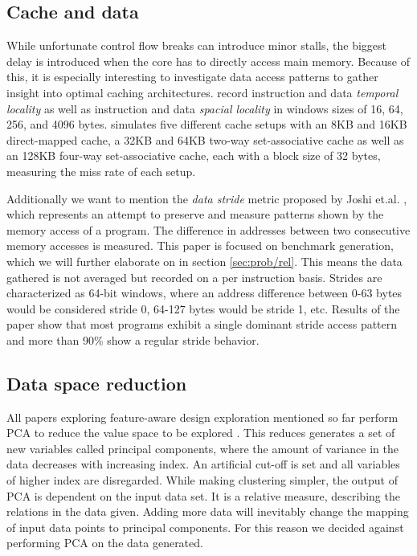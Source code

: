 \documentclass[../bachelor_paper.tex]{subfiles}
\begin{document}
\subsection{Cache and data}
While unfortunate control flow breaks can introduce minor stalls, the biggest delay is introduced when the core has to directly access main memory. Because of this, it is especially interesting to investigate data access patterns to gather insight into optimal caching architectures. \cite{phansalkarMeasuringProgramSimilarity2005,joshiMeasuringBenchmarkSimilarity2006} record instruction and data \emph{temporal locality} as well as instruction and data \emph{spacial locality} in windows sizes of 16, 64, 256, and 4096 bytes. \cite{eeckhoutQuantifyingImpactInput} simulates five different cache setups with an 8KB and 16KB direct-mapped cache, a 32KB and 64KB two-way set-associative cache as well as an 128KB four-way set-associative cache, each with a block size of 32 bytes, measuring the miss rate of each setup.

Additionally we want to mention the \emph{data stride} metric proposed by Joshi et.al. \cite{joshiDistillingEssenceProprietary2008}, which represents an attempt to preserve and measure patterns shown by the memory access of a program. The difference in addresses between two consecutive memory accesses is measured. This paper is focused on benchmark generation, which we will further elaborate on in section \ref{sec:prob/rel}. This means the data gathered is not averaged but recorded on a per instruction basis. Strides are characterized as 64-bit windows, where an address difference between 0-63 bytes would be considered stride 0, 64-127 bytes would be stride 1, etc. Results of the paper show that most programs exhibit a single dominant stride access pattern and more than 90\% show a regular stride behavior.

\subsection{Data space reduction}
All papers exploring feature-aware design exploration mentioned so far perform \acl{PCA} to reduce the value space to be explored \cite{phansalkarMeasuringProgramSimilarity2005,joshiMeasuringBenchmarkSimilarity2006,eeckhoutQuantifyingImpactInput}. This reduces generates a set of new variables called principal components, where the amount of variance in the data decreases with increasing index. An artificial cut-off is set and all variables of higher index are disregarded. While making clustering simpler, the output of \ac{PCA} is dependent on the input data set. It is a relative measure, describing the relations in the data given. Adding more data will inevitably change the mapping of input data points to principal components. For this reason we decided against performing \ac{PCA} on the data generated.
\end{document}
